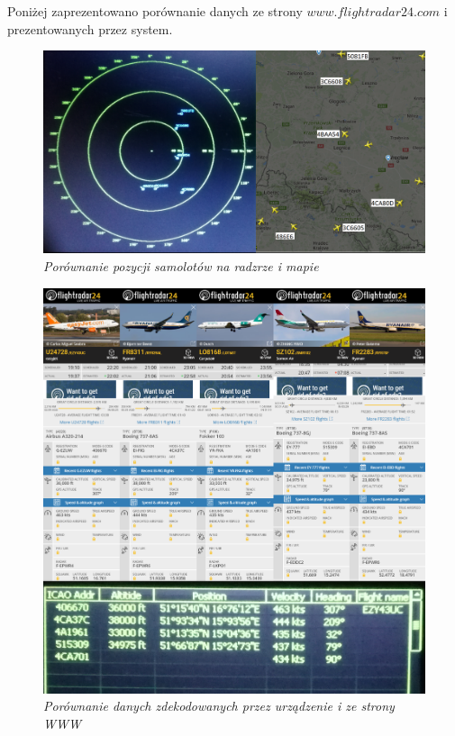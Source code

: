 \documentclass[eng,printmode]{mgr}
\begin{document}
Poniżej zaprezentowano porównanie danych ze strony $www.flightradar24.com$ i prezentowanych przez system.

\begin{figure}[!h]
    \centering
    \includegraphics[width=\textwidth]{images/radarTest2.png}
    \caption{\textit{Porównanie pozycji samolotów na radzrze i mapie}}
\end{figure}
\newpage
\begin{figure}[!h]
    \centering
    \includegraphics[width=\textwidth]{images/dataTest.png}
    \caption{\textit{Porównanie danych zdekodowanych przez urządzenie i ze strony WWW}}
\end{figure}
\end{document}
